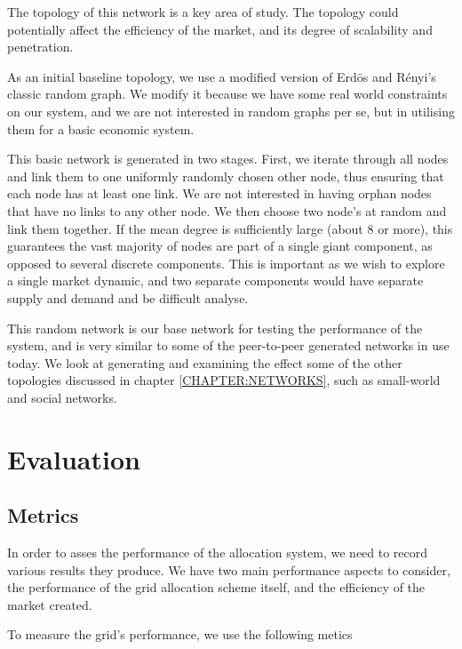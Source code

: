 The topology of this network is a key area of study. The topology could
potentially affect the efficiency of the market, and its degree of scalability
and penetration.

As an initial baseline topology, we use a modified version of Erd{\"{o}}s and
R{\'{e}}nyi's\cite{net-erdos59-random} classic random graph. We modify
it because we have some real world constraints on our system, and we are not
interested in random graphs per se, but in utilising them for a basic economic
system. 

This basic network is generated in two stages. First, we iterate through all
nodes and link them to one uniformly randomly chosen other node, thus ensuring
that each node has at least one link.  We are not interested in having orphan
nodes that have no links to any other node. We then choose two node's at random
and link them together. If the mean degree is sufficiently large (about 8 or
more), this guarantees the vast majority of nodes are part of a single giant
component, as opposed to several discrete components. This is important as we
wish to explore a single market dynamic, and two separate components would have
separate supply and demand and be difficult analyse.

This random network is our base network for testing the performance of the
system, and is very similar to some of the peer-to-peer generated networks in
use today\cite{net-cohen03-bittorrent}. We look at generating and examining the
effect some of the other topologies discussed in chapter \ref{CHAPTER:NETWORKS}, such
as small-world and social networks.

\section{Evaluation}
\label{SEC:METHOD:EVALUATION}

\subsection{Metrics}

In order to asses the performance of the allocation system, we need to record
various results they produce. We have two main performance aspects to
consider, the performance of the grid allocation scheme itself, and the
efficiency of the market created.

To measure the grid's performance, we use the following metics

